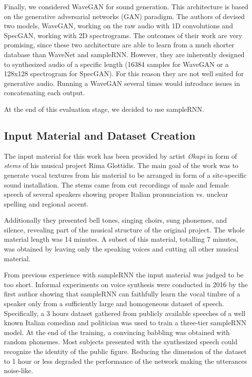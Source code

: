 Finally, we considered WaveGAN for sound generation. This architecture is based on the generative adversarial networks (GAN) paradigm. The authors of \cite{donahue2018synthesizing} devised two models, WaveGAN, working on the raw audio with 1D convolutions and SpecGAN, working with 2D spectrograms. The outcomes of their work are very promising, since these two architecture are able to learn from a much shorter database than WaveNet and sampleRNN. However, they are inherently designed to synthesized audio of a specific length (16384 samples for WaveGAN or a 128x128 spectrogram for SpecGAN). For this reason they are not well suited for generative audio. Running a WaveGAN several times would introduce issues in concatenating each output.

At the end of this evaluation stage, we decided to use sampleRNN. 


\subsection{Input Material and Dataset Creation}\label{subsec:input}

The input material for this work has been provided by artist \textit{\O kapi} in form of \textit{stems} of his musical project Rima Glottidis. The main goal of the work was to generate vocal textures from his material to be arranged in form of a site-specific sound installation. The stems came from cut recordings of male and female speech of several speakers showing proper Italian pronunciation vs. unclear spelling and regional accent.

Additionally they presented bell tones, singing choirs, sung phonemes, and silence, revealing part of the musical structure of the original project. The whole material length was 14 minutes. A subset of this material, totalling 7 minutes, was obtained by leaving only the speaking voices and cutting all other musical material.

From previous experience with sampleRNN the input material was judged to be too short. Informal experiments on voice synthesis were conducted in 2016 by the first author showing that sampleRNN can faithfully learn the vocal timbre of a speaker only from a sufficiently large and homogeneous dataset of speech. Specifically, a 3 hours dataset gathered from publicly available speeches of a well known Italian comedian and politician was used to train a three-tier sampleRNN model. At the end of the training, a convincing babbling was obtained with random phonemes. Most subjects presented with the synthesized speech could recognize the identity of the public figure. Reducing the dimension of the dataset to 1 hour or less degraded the performance of the network making the utterances noise-like.

